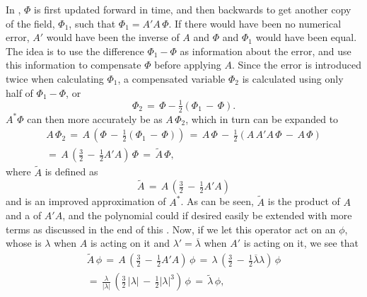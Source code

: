 In \BFECC, $\Phi$ is first updated forward in time, and then backwards to get another copy of the field, $\Phi_1$, such that $\Phi_1 = A'A\,\Phi$. If there would have been no numerical error, $A'$ would have been the inverse of $A$ and $\Phi$ and $\Phi_1$ would have been equal. The idea is to use the difference $\Phi_1-\Phi$ as information about the error, and use this information to compensate $\Phi$ before applying $A$. Since the error is introduced twice when calculating $\Phi_1$, a compensated variable $\Phi_2$ is calculated using only half of $\Phi_1-\Phi$, or
%
\begin{equation}
\Phi_2 \,=\, \Phi - \tfrac{1}{2}(\Phi_1 \,-\, \Phi).
\end{equation}
%
$A^*\Phi$ can then more accurately be \approximated as $A\,\Phi_2$, which in turn can be expanded to
%
\begin{equation}
\begin{array}{c}
A\,\Phi_2 \,=\, A\,\left(\Phi \,-\, \tfrac{1}{2}(\Phi_1 \,-\, \Phi)\right) \,=\, A\,\Phi \,-\, \tfrac{1}{2}(A\,A'A\,\Phi \,-\, A\,\Phi) \\
=\, A\,\left(\tfrac{3}{2} \,-\, \tfrac{1}{2}A'A\right)\,\Phi \,=\, \tilde{A}\,\Phi,
\end{array}
\end{equation}
%
where $\tilde{A}$ is defined as
%
\begin{equation} \label{eq:compensated_advection_operator}
\tilde{A} \,=\, A\,\left(\tfrac{3}{2} \,-\, \tfrac{1}{2}A'A\right)
\end{equation}
and is an improved approximation of $A^*$. As can be seen, $\tilde{A}$ is the product of $A$ and a \polynomial of $A'A$, and the polynomial could if desired easily be extended with more terms as discussed in the end of this \levelname. Now, if we let this operator act on an \eigenfunction $\phi$, whose \eigenvalue is $\lambda$ when $A$ is acting on it and $\lambda' = \overline{\lambda}$ when $A'$ is acting on it, we see that 
%
\begin{equation}
\renewcommand*{\arraystretch}{1.5}
\begin{array}{c}
\displaystyle
\tilde{A}\,\phi \,=\, A\,\left(\tfrac{3}{2} \,-\, \tfrac{1}{2}A'A\right)\,\phi \,=\, \lambda\,\left(\tfrac{3}{2} \,-\, \tfrac{1}{2}\overline{\lambda}\lambda\right)\,\phi \\
\displaystyle =\, \frac{\lambda}{|\lambda|}\,\left(\tfrac{3}{2}\,|\lambda| \,-\, \tfrac{1}{2}|\lambda|^3\right)\,\phi \,=\, \tilde{\lambda}\,\phi,
\end{array}
\end{equation}
